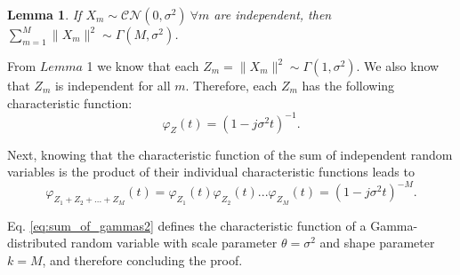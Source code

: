 \documentclass[10pt,journal,comsoc,final]{IEEEtran}
\newtheorem{lemma}{Lemma}
\begin{document}
\begin{lemma} If $X_{m} \sim \mathcal{CN}(0,\sigma^2) \ \forall m$ are independent, then $\sum_{m=1}^{M}{\lVert X_{m} \rVert^{2}} \sim \Gamma(M,\sigma^2)$.
\end{lemma}
\begin{IEEEproof} From $Lemma$ 1 we know that each $Z_{m} = \lVert X_{m} \rVert^{2} \sim \Gamma(1,\sigma^{2})$. We also know that $Z_{m}$ is independent for all $m$. Therefore, each $Z_{m}$ has the following characteristic function:
\begin{equation}\label{eq:sum_of_gammas1}
\varphi_{Z}(t) = (1-j\sigma^{2}t)^{-1}.
\end{equation}

Next, knowing that the characteristic function of the sum of independent random variables is the product of their individual characteristic functions leads to
\begin{equation}\label{eq:sum_of_gammas2}
\varphi_{Z_{1}+Z_{2}+ ... +Z_{M}}(t) = \varphi_{Z_{1}}(t) \varphi_{Z_{2}}(t) ... \varphi_{Z_{M}}(t) = (1-j\sigma^{2}t)^{-M}.
\end{equation}

Eq. \eqref{eq:sum_of_gammas2} defines the characteristic function of a Gamma-distributed random variable with scale parameter $\theta = \sigma^2$ and shape parameter $k = M$, and therefore concluding the proof.
\end{IEEEproof}
\end{document}
